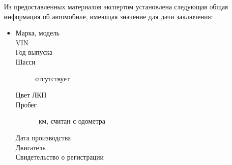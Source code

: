 \par Из предоставленных материалов   экспертом установлена следующая общая информация об автомобиле, имеющая значение для дачи заключения:
\parbox[]{10cm}{}
\begin{itemize}
	\item[ ] 
	\begin{description}
		\item[Марка, модель] \hfill {}
		\item[VIN] \hfill \vin
		\item[Год выпуска] \hfill {}
		\item[Шасси] \hfill отсутствует
		\item[Цвет ЛКП] \hfill {}
		\item[Пробег] \hfill  {}\, км, считан с одометра
		\item[Дата производства] \hfill {}
		\item[Двигатель] \hfill {}
		\item[Свидетельство о регистрации] \hfill {}
	\end{description}
\end{itemize}
%
